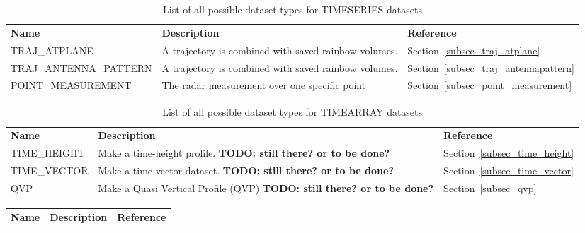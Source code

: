 \documentclass[a4paper,11pt,pdftex,twoside]{scrartcl}
\renewcommand{\bf}{\normalfont \bfseries}
\begin{document}
{{{\begin{table}[H]
\begin{tabularx}{\textwidth}{lXl}
\bf{Name}     & \bf{Description}                                      & \bf{Reference}\\

TRAJ\_ATPLANE & A trajectory is combined with saved rainbow
                volumes.                                              & Section~\ref{subsec_traj_atplane}\\
TRAJ\_ANTENNA\_PATTERN & A trajectory is combined with saved rainbow
                         volumes.                                     & Section~\ref{subsec_traj_antennapattern}\\
POINT\_MEASUREMENT & The radar measurement over one specific point                              & Section~\ref{subsec_point_measurement}\\
\end{tabularx}
\caption{List of all possible dataset types for TIMESERIES datasets}
\label{tab_datasets_TIMESERIES}
\end{table}

\begin{table}[H]
\begin{tabularx}{\textwidth}{lXl}
\bf{Name}     & \bf{Description}                 & \bf{Reference}\\
TIME\_HEIGHT  & Make a time-height profile. {\bf TODO: still there? or to be done? }                                           & Section~\ref{subsec_time_height}\\
TIME\_VECTOR  & Make a time-vector dataset. {\bf TODO: still there? or to be done? }                                          & Section~\ref{subsec_time_vector}\\
QVP  & Make a Quasi Vertical Profile (QVP)  {\bf TODO: still there? or to be done? }                                         & Section~\ref{subsec_qvp}\\
\end{tabularx}
\caption{List of all possible dataset types for TIMEARRAY datasets}
\label{tab_datasets_TIMEARRAY}
\end{table}

\begin{table}[H]
\begin{tabularx}{\textwidth}{lXl}
\bf{Name}     & \bf{Description}                 & \bf{Reference}\\


\end{tabularx}
\end{table}}}}
\end{document}
